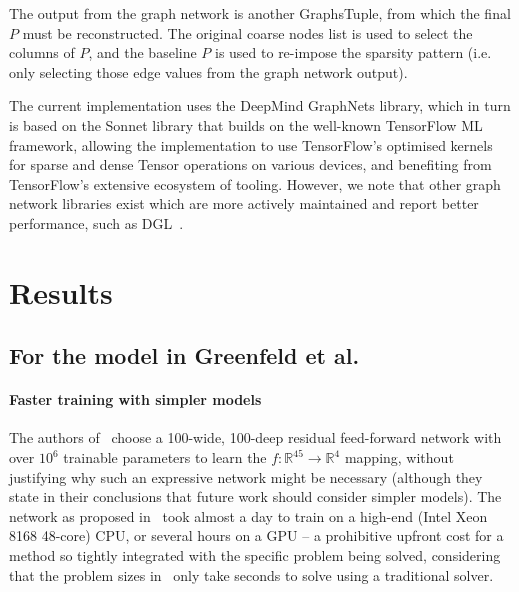 \documentclass{svproc}
\newcommand{\etal}{et al. }
\begin{document}
The output from the graph network is another GraphsTuple, from which the final $P$ must be reconstructed. The original coarse nodes list is used to select the columns of $P$, and the baseline $P$ is used to re-impose the sparsity pattern (i.e. only selecting those edge values from the graph network output). 

The current implementation uses the DeepMind GraphNets library, which in turn is based on the Sonnet library that builds on the well-known TensorFlow ML framework, allowing the implementation to use TensorFlow's optimised kernels for sparse and dense Tensor operations on various devices, and benefiting from TensorFlow's extensive ecosystem of tooling. However, we note that other graph network libraries exist which are more actively maintained and report better performance, such as DGL~\cite{DGL}.



\section{Results}
\label{sec:results}
\subsection{For the model in Greenfeld \etal}

\paragraph{Faster training with simpler models}
The authors of~\cite{Greenfeld2019} choose a 100-wide, 100-deep residual feed-forward network with over $10^6$ trainable parameters to learn the $f:\mathbb{R}^{45} \rightarrow \mathbb{R}^4$ mapping, without justifying why such an expressive network might be necessary (although they state in their conclusions that future work should consider simpler models). The network as proposed in~\cite{Greenfeld2019} took almost a day to train on a high-end (Intel Xeon 8168 48-core) CPU, or several hours on a GPU -- a prohibitive upfront cost for a method so tightly integrated with the specific problem being solved, considering that the problem sizes in~\cite{Greenfeld2019} only take seconds to solve using a traditional solver.

\end{document}

